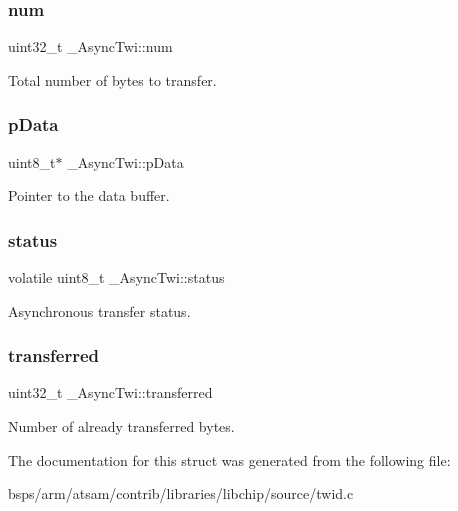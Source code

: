 \subsubsection{\texorpdfstring{num}{num}}
{\footnotesize\ttfamily uint32\+\_\+t \+\_\+\+Async\+Twi\+::num}

Total number of bytes to transfer. \mbox{\label{struct__AsyncTwi_a4e824a77aa09700f93ee35d475166729}} 
\subsubsection{\texorpdfstring{pData}{pData}}
{\footnotesize\ttfamily uint8\+\_\+t$\ast$ \+\_\+\+Async\+Twi\+::p\+Data}

Pointer to the data buffer. \mbox{\label{struct__AsyncTwi_ad7531ed0181cd614119811fa5b221fa9}} 
\subsubsection{\texorpdfstring{status}{status}}
{\footnotesize\ttfamily volatile uint8\+\_\+t \+\_\+\+Async\+Twi\+::status}

Asynchronous transfer status. \mbox{\label{struct__AsyncTwi_a5df6d1f444cbb84b919fc9444a1fa6a6}} 
\subsubsection{\texorpdfstring{transferred}{transferred}}
{\footnotesize\ttfamily uint32\+\_\+t \+\_\+\+Async\+Twi\+::transferred}

Number of already transferred bytes. 

The documentation for this struct was generated from the following file\+:\begin{DoxyCompactItemize}
\item 
bsps/arm/atsam/contrib/libraries/libchip/source/twid.\+c\end{DoxyCompactItemize}
